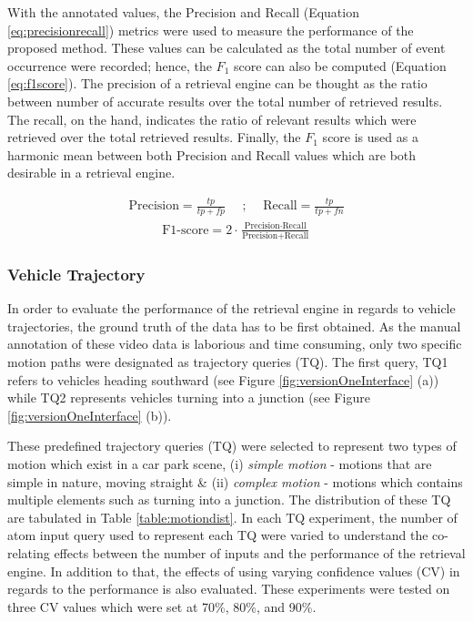 With the annotated values, the Precision and Recall (Equation \ref{eq:precisionrecall}) metrics were used to measure the performance of the proposed method. These values can be calculated as the total number of event occurrence were recorded; hence, the $F_1$ score can also be computed (Equation \ref{eq:f1score}). The precision of a retrieval engine can be thought as the ratio between number of accurate results over the total number of retrieved results. The recall, on the hand, indicates the ratio of relevant results which were retrieved over the total retrieved results. Finally, the $F_1$ score is used as a harmonic mean between both Precision and Recall values which are both desirable in a retrieval engine.

\begin{align}
\label{eq:precisionrecall}
    \text{Precision} = \frac{tp}{tp + fp}   \hspace{1em} \text{ ; }  \hspace{1em} \text{Recall}  = \frac{tp}{tp + fn}
\end{align}
\begin{align}
\label{eq:f1score}
\text{F1-score}  = 2\cdot\frac{\text{Precision} \cdot \text{Recall}}{\text{Precision} + \text{Recall}}
\end{align}



\subsubsection{Vehicle Trajectory}

In order to evaluate the performance of the retrieval engine in regards to vehicle trajectories, the ground truth of the data has to be first obtained. As the manual annotation of these video data is laborious and time consuming, only two specific motion paths were designated as trajectory queries (TQ). The first query, TQ1 refers to vehicles heading southward (see Figure \ref{fig:versionOneInterface} (a)) while TQ2 represents vehicles turning into a junction (see Figure \ref{fig:versionOneInterface} (b)).

These predefined trajectory queries (TQ) were selected to represent two types of motion which exist in a car park scene, (i) \textit{simple motion} - motions that are simple in nature, moving straight \& (ii) \textit{complex motion} - motions which contains multiple elements such as turning into a junction. The distribution of these TQ are tabulated in Table \ref{table:motiondist}. In each TQ experiment, the number of atom input query used to represent each TQ were varied to understand the co-relating effects between the number of inputs and the performance of the retrieval engine. In addition to that, the effects of using varying confidence values (CV) in regards to the performance is also evaluated. These experiments were tested on three CV values which were set at 70\%, 80\%, and 90\%.


